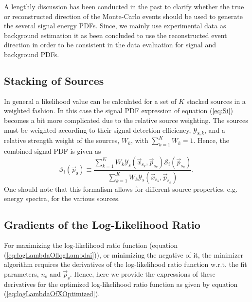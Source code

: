 \documentclass{article}
\newcommand{\ns}{n_{\mathrm{s}}}
\newcommand{\ps}{\vec{p}_{\mathrm{s}}}
\newcommand{\psk}{\vec{p}_{\mathrm{s}_k}}
\newcommand{\xsk}{\vec{x}_{\mathrm{s}_k}}
\begin{document}
A lengthly discussion has been conducted in the past to clarify whether the true or
reconstructed direction of the Monte-Carlo events should be used to generate
the several signal energy PDFs. Since, we mainly use experimental data as
background estimation it as been concluded to use the reconstructed event
direction in order to be consistent in the data evaluation for signal and
background PDFs.

\subsection{Stacking of Sources}

In general a likelihood value can be calculated for a set of $K$ stacked
sources in a weighted fashion. In this case the signal PDF expression of
equation (\ref{eq:Si}) becomes a bit more complicated due to the relative
source weighting. The sources must be weighted according to their signal detection
efficiency, $\mathcal{Y}_{\mathrm{s},k}$, and a relative strength weight of the
sources, $W_k$, with $\sum_{k=1}^{K} W_k = 1$. Hence, the combined signal PDF is
given as
\begin{equation}
 \mathcal{S}_i(\ps) \equiv \frac{\sum_{k=1}^{K} W_k \mathcal{Y}_{\mathrm{s}}(\xsk,\psk) \mathcal{S}_{i}(\psk)}{\sum_{k=1}^{K}W_k\mathcal{Y}_{\mathrm{s}}(\xsk,\psk)}.
 \label{eq:SiStacking}
\end{equation}
One should note that this formalism allows for different source properties, e.g.
energy spectra, for the various sources.


\subsection{Gradients of the Log-Likelihood Ratio}

For maximizing the log-likelihood ratio function (equation (\ref{eq:logLambdaOflogLambdai})),
or minimizing the negative of it, the minimizer algorithm requires the
derivatives of the log-likelihood ratio function w.r.t. the fit parameters,
$\ns$ and $\ps$.
Hence, here we provide the expressions of these derivatives
for the optimized log-likelihood ratio function as given by equation
(\ref{eq:logLambdaOfXOptimized}).
\end{document}
